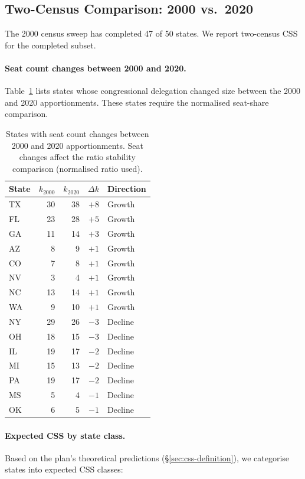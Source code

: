 \subsection{Two-Census Comparison: 2000 vs.\ 2020}
\label{sec:two-census}

The 2000 census sweep has completed 47 of 50 states.
We report two-census CSS for the completed subset.

\paragraph{Seat count changes between 2000 and 2020.}
Table~\ref{tab:seat-changes} lists states whose congressional delegation
changed size between the 2000 and 2020 apportionments.
These states require the normalised seat-share comparison.

\begin{table}[h]
\centering
\caption{States with seat count changes between 2000 and 2020 apportionments.
  Seat changes affect the ratio stability comparison (normalised ratio used).}
\label{tab:seat-changes}
\small
\begin{tabular}{l r r r l}
\toprule
State & $k_{2000}$ & $k_{2020}$ & $\Delta k$ & Direction \\
\midrule
TX & 30 & 38 & $+8$ & Growth \\
FL & 23 & 28 & $+5$ & Growth \\
GA & 11 & 14 & $+3$ & Growth \\
AZ &  8 &  9 & $+1$ & Growth \\
CO &  7 &  8 & $+1$ & Growth \\
NV &  3 &  4 & $+1$ & Growth \\
NC & 13 & 14 & $+1$ & Growth \\
WA &  9 & 10 & $+1$ & Growth \\
NY & 29 & 26 & $-3$ & Decline \\
OH & 18 & 15 & $-3$ & Decline \\
IL & 19 & 17 & $-2$ & Decline \\
MI & 15 & 13 & $-2$ & Decline \\
PA & 19 & 17 & $-2$ & Decline \\
MS &  5 &  4 & $-1$ & Decline \\
OK &  6 &  5 & $-1$ & Decline \\
\bottomrule
\end{tabular}
\end{table}

\paragraph{Expected CSS by state class.}
Based on the plan's theoretical predictions (\S\ref{sec:css-definition}),
we categorise states into expected CSS classes:

